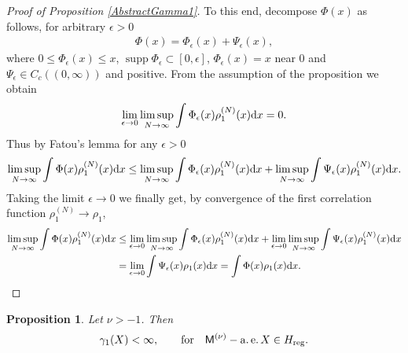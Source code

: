 \documentclass[pdftex]{sigma}
\numberwithin{equation}{section}
\newtheorem{Proposition}[Theorem]{Proposition}
{ \theoremstyle{definition}
\newtheorem{Definition}[Theorem]{Definition}
\newtheorem{Remark}[Theorem]{Remark} }
\begin{document}
\begin{proof}[Proof of Proposition \ref{AbstractGamma1}]
To this end, decompose $\Phi(x)$ as follows, for arbitrary $\epsilon>0$
\begin{gather*}
\Phi(x)=\Phi_{\epsilon}(x)+\Psi_{\epsilon}(x),
\end{gather*}
where $0\le \Phi_{\epsilon}(x)\le x$, $\operatorname{supp} \Phi_{\epsilon} \subset [0,\epsilon]$, $\Phi_{\epsilon}(x)=x$ near $0$ and $\Psi_{\epsilon}\in C_{c} ((0,\infty) )$ and positive. From the assumption of the proposition we obtain
\begin{gather*}
\lim_{\epsilon \to 0} \limsup_{N \to \infty}\int\Phi_{\epsilon}(x)\rho_1^{(N)}(x){\rm d}x=0.
\end{gather*}
Thus by Fatou's lemma for any $\epsilon>0$
\begin{gather*}
\limsup_{N \to \infty}\int\Phi(x)\rho_1^{(N)}(x){\rm d}x\le \limsup_{N \to \infty}\int\Phi_{\epsilon}(x)\rho_1^{(N)}(x){\rm d}x+\limsup_{N \to \infty}\int\Psi_{\epsilon}(x)\rho_1^{(N)}(x){\rm d}x.
\end{gather*}
Taking the limit $\epsilon \to 0$ we finally get, by convergence of the first correlation function $\rho_1^{(N)} \to \rho_1$,
\begin{align*}
\limsup_{N \to \infty}\int\Phi(x)\rho_1^{(N)}(x){\rm d}x&\le \lim_{\epsilon \to 0}\limsup_{N \to \infty}\int\Phi_{\epsilon}(x)\rho_1^{(N)}(x){\rm d}x+ \lim_{\epsilon \to 0}\limsup_{N \to \infty}\int\Psi_{\epsilon}(x)\rho_1^{(N)}(x){\rm d}x\\
&=\lim_{\epsilon \to 0}\int\Psi_{\epsilon}(x)\rho_1(x){\rm d}x=\int \Phi(x)\rho_1(x){\rm d}x.\tag*{\qed}
\end{align*}\renewcommand{\qed}{}
\end{proof}

\begin{Proposition}\label{FinitenessGamma1}Let $\nu>-1$. Then
\begin{gather*}
\gamma_1(X)<\infty, \qquad \text{for} \quad \mathsf{M}^{(\nu)}-\operatorname{a.e.} X \in H_{{\rm reg}}.
\end{gather*}
\end{Proposition}
\end{document}
